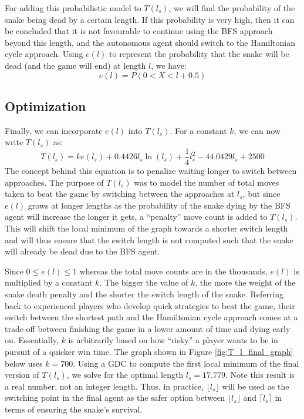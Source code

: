\documentclass[12pt]{article}
\begin{document}
For adding this probabilistic model to $T(l_s)$, we will find the probability of the snake being dead by a certain length. If this probability is very high, then it can be concluded that it is not favourable to continue using the BFS approach beyond this length, and the autonomous agent should switch to the Hamiltonian cycle approach. Using $e(l)$ to represent the probability that the snake will be dead (and the game will end) at length $l$, we have:
\begin{equation}
e(l) = P(0 < X < l + 0.5)
\end{equation}

\subsection{Optimization}

Finally, we can incorporate $e(l)$ into $T(l_s)$. For a constant $k$, we can now write $T(l_s)$ as:
\begin{equation}
T(l_s) = ke(l_s) + 0.4426l_{s}\ln(l_{s}) + \frac{1}{4}l_{s}^2 - 44.0429l_{s} + 2500
\end{equation}
The concept behind this equation is to penalize waiting longer to switch between approaches. The purpose of $T(l_s)$ was to model the number of total moves taken to beat the game by switching between the approaches at $l_s$, but since $e(l)$ grows at longer lengths as the probability of the snake dying by the BFS agent will increase the longer it gets, a ``penalty'' move count is added to $T(l_s)$. This will shift the local minimum of the graph towards a shorter switch length and will thus ensure that the switch length is not computed such that the snake will already be dead due to the BFS agent.

Since $0 \leq e(l) \leq 1$ whereas the total move counts are in the thousands, $e(l)$ is multiplied by a constant $k$. The bigger the value of $k$, the more the weight of the snake death penalty and the shorter the switch length of the snake. Referring back to experienced players who develop quick strategies to beat the game, their switch between the shortest path and the Hamiltonian cycle approach comes at a trade-off between finishing the game in a lower amount of time and dying early on. Essentially, $k$ is arbitrarily based on how ``risky'' a player wants to be in pursuit of a quicker win time. The graph shown in Figure \ref{fig:T_l_final_graph} below uses $k=700$. Using a GDC to compute the first local minimum of the final version of $T(l_s)$, we solve for the optimal length $l_s = 17.779$. Note this result is a real number, not an integer length. Thus, in practice, $\lfloor{l_s}\rfloor$ will be used as the switching point in the final agent as the safer option between $\lfloor{l_s}\rfloor$ and $\lceil{l_s}\rceil$ in terms of ensuring the snake's survival.
\end{document}
